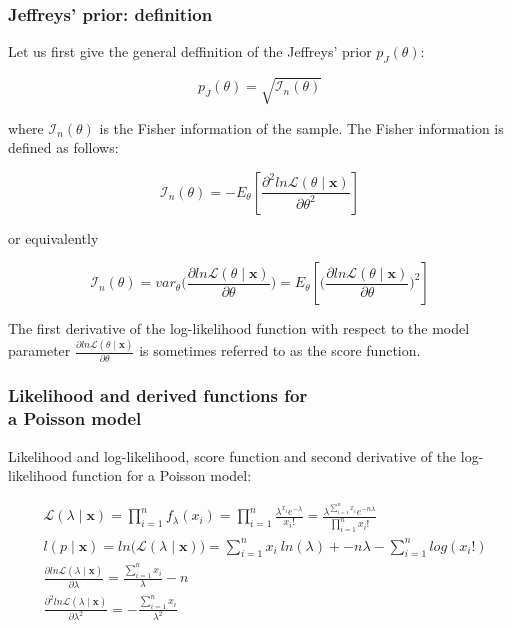 \documentclass[border=5mm, convert, usenames, dvipsnames,beamer]{standalone}
\begin{document}
\begin{frame}
\frametitle{Jeffreys' prior: definition}

\vspace{35
}
\noindent
Let us first give the general deffinition of the Jeffreys' prior $p_{J}(\theta)$:

$$
p_{J}(\theta) = \sqrt{\mathcal{I}_{n}(\theta)}
$$

\noindent
where $\mathcal{I}_{n}(\theta)$ is the Fisher information of the sample. The Fisher information is defined as follows:

$$
 \mathcal{I}_{n}(\theta) = -E_{\theta} \left[ \frac{ \partial^{2} ln \mathcal{L}(\theta \mid \textbf{x} )} {\partial \theta^{2}}  \right]
$$

\noindent
or equivalently

$$
 \mathcal{I}_{n}(\theta) = var_{\theta} \bigg( \frac{ \partial ln\mathcal{L}(\theta \mid \textbf{x})} {\partial \theta}  \bigg) = E _{\theta}\left[ \bigg(\frac{ \partial ln\mathcal{L}(\theta \mid \textbf{x})} {\partial \theta}\bigg)^{2} \right]
$$

\noindent
The first derivative of the log-likelihood function with respect to the model parameter $\frac{ \partial ln\mathcal{L}(\theta \mid \textbf{x})} {\partial \theta}$ is sometimes referred to as the score function.

\par
\end{frame}





\begin{frame}[ fragile]{}

\frametitle{Likelihood and derived functions for \\ a Poisson model}


\vspace{20mm}
\noindent
Likelihood and log-likelihood, score function and second derivative of the log-likelihood function for a Poisson model:


\begin{align*} 
& \mathcal{L}(\lambda \mid \textbf{x} ) =  \prod_{i=1}^{n} f_{\lambda}(x_{i}) = \prod_{i=1}^{n}  \frac{\lambda^{x_{i}} e^{- \lambda}}{x_{i} !}  =  
  \frac{\lambda^{ \sum_{i=1}^{n} x_{i}} e^{- n \lambda}}{ \prod_{i=1}^{n} x_{i} !}                            \\
& l(p \mid \textbf{x} ) = ln \big( \mathcal{L}(\lambda \mid \textbf{x} ) \big) =    \sum_{i=1}^{n} x_{i} \  ln(\lambda) + - n \lambda -  \sum_{i=1}^{n} log(x_{i}!)
    \\
& \frac{ \partial ln\mathcal{L}(\lambda \mid \textbf{x})} {\partial \lambda} =  \frac{ \sum_{i=1}^{n} x_{i}}{\lambda} - n  \\
&  \frac{ \partial^{2} ln \mathcal{L}(\lambda \mid \textbf{x} )} {\partial \lambda^{2}}=    - \frac{\sum_{i=1}^{n} x_{i}}{ \lambda^{2}}    \\
\end{align*}
$$

\par
\end{frame}
\end{document}
